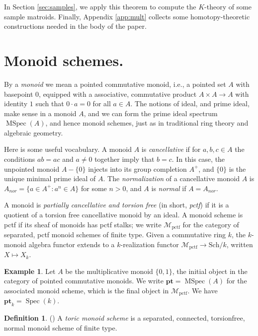 \documentclass[12pt]{amsart}
\def\cMpctf{{\mathcal M}_{\text{pctf}}}
\newcommand{\Schk}{\mathrm{Sch}/k}
\newcommand{\pt}{\mathbf{pt}}
\def\Spec{\operatorname{Spec}}
\def\MSpec{\operatorname{MSpec}}
\numberwithin{equation}{section}
\theoremstyle{plain}
\theoremstyle{definition}
\newtheorem{defn}[equation]{Definition}
\newtheorem{ex}[equation]{Example}
\theoremstyle{remark}
\begin{document}
In Section \ref{sec:samples}, we apply this theorem to compute
the $K$-theory of some sample matroids. Finally,
Appendix \ref{app:mult} collects some homotopy-theoretic
constructions needed in the body of the paper.

 \vspace{.1in}
 


\section{Monoid schemes.}\label{sec:toric}

By a {\it monoid} we mean a pointed commutative monoid,
i.e., a pointed set $A$ with basepoint $0$, equipped with a
associative, commutative product $A\times A \to A$ with
identity $1$ such that $0\cdot a = 0$ for all $a\in A$.
%
The notions of ideal, and prime ideal, make sense in a monoid $A$,
and we can form the prime ideal spectrum
$\MSpec(A)$, and hence monoid schemes,
just as in traditional ring theory and algebraic geometry.

 Here is some useful vocabulary. A monoid $A$ is {\it cancellative} if for $a, b, c \in A$
the conditions $ab = ac$ and $a\ne0$ together imply that $b = c$.
In this case, the unpointed monoid $A- \{0\}$ injects into
its group completion $A^+$,
and $\{0\}$ is the unique minimal prime ideal of $A$.
The {\it normalization} of a cancellative monoid $A$ is
$A_{nor}=\{a\in A^+: a^n\in A\}$
for some $n>0$, and $A$ is {\it normal} if $A=A_{nor}$.

A monoid is {\it partially cancellative and torsion free} (in short, {\it pctf}) if it is a quotient of a torsion free cancellative monoid by an ideal. A monoid scheme is pctf if its sheaf of monoids has pctf stalks; we write $\cMpctf$ for the category of separated, pctf monoid schemes of finite type. Given a commutative ring $k$, the $k$-monoid algebra functor extends to a $k$-realization functor $\cMpctf\to \Schk$, written $X\mapsto X_k$.

\begin{ex}
Let $A$ be the multiplicative monoid $\{0,1\}$, the initial object in the category of pointed
 commutative monoids. We write $\pt = \MSpec(A)$ for the associated monoid scheme, which is the final object in $\cMpctf$. We have $\pt_k = \Spec (k)$.
\end{ex}


\begin{defn}\label{def:TMS}  (\cite[4.1]{CHWW})
A {\it toric monoid scheme} is a separated, connected, torsionfree,
normal monoid scheme of finite type. 
\end{defn}
\end{document}
